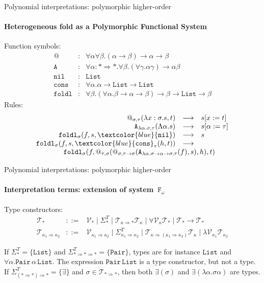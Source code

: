 \documentclass[10pt,presentation,color=names]{beamer}
\newcommand{\Fomega}{\mathtt{F}_\omega}
\newcommand{\arrkind}{\Rightarrow}
\newcommand{\arrtype}{\rightarrow}
\newcommand{\abs}[2]{\lambda #1.#2}
\newcommand{\tabs}[2]{\Lambda #1.#2}
\newcommand{\red}{\longrightarrow}
\newcommand{\Tc}{\mathcal{T}}
\newcommand{\Vc}{\mathcal{V}}
\newcommand{\symb}[1]{\textcolor{blue}{\mathtt{#1}}}
\newcommand{\List}{\mathtt{List}}
\newcommand{\Pair}{\mathtt{Pair}}
\newcommand{\nil}{\symb{nil}}
\newcommand{\cons}{\symb{cons}}
\begin{document}
\begin{frame}{Polynomial interpretations: polymorphic higher-order}
  \framesubtitle{Heterogeneous fold as a Polymorphic Functional System}
  Function symbols:
  \[
  \begin{array}{rcl}
    @ & : & \forall \alpha \forall \beta . (\alpha \arrtype \beta) \arrtype \alpha \arrtype \beta \\
    \mathtt{A} & : & \forall \alpha : * \arrkind * . \forall \beta .
    (\forall \gamma .\alpha \gamma) \arrtype \alpha \beta \\
    \mathtt{nil} & : & \List \\
    \mathtt{cons} & : & \forall \alpha . \alpha \arrtype \List \arrtype \List \\
    \mathtt{foldl} & : & \forall \beta . (\forall \alpha . \beta \arrtype \alpha \arrtype \beta) \arrtype \beta \arrtype \List \arrtype \beta
  \end{array}
  \]\pause
  Rules:
  \[
  \begin{array}{rcl}
    @_{\sigma,\tau}(\abs{x:\sigma}{s},t) & \red & s[x:=t] \\
    \mathtt{A}_{\abs{\alpha}{\sigma},\tau}(\tabs{\alpha}{s}) & \red & s[\alpha:=\tau] \\
    \mathtt{foldl}_\sigma(f,s,\nil) & \red & s \\
    \mathtt{foldl}_\sigma(f,s,\cons_\tau(h,t)) & \red & \\
    \multicolumn{3}{c}{\quad\quad\mathtt{foldl}_\sigma(f,@_{\tau,\sigma}(@_{\sigma,\tau\arrtype\sigma}(\mathtt{A}_{\abs{\alpha}{\sigma\arrtype\alpha\arrtype\sigma},\tau}(f),s),h),t)}
  \end{array}
  \]
\end{frame}

\begin{frame}{Polynomial interpretations: polymorphic higher-order}
  \framesubtitle{Interpretation terms: extension of system~$\Fomega$}
  Type constructors:
  \[
  \begin{array}{rcl}
    \Tc_{*} &::=& \Vc_{*} \mid \Sigma^T_{*} \mid \Tc_{\kappa\arrkind
      *}\Tc_{\kappa} \mid \forall\Vc_\kappa\Tc_* \mid
    \Tc_*\arrtype\Tc_* \\ \Tc_{\kappa_1\arrkind\kappa_2} &::=&
    \Vc_{\kappa_1\arrkind\kappa_2} \mid
    \Sigma^T_{\kappa_1\arrkind\kappa_2} \mid
    \Tc_{\kappa\arrkind(\kappa_1\arrkind\kappa_2)}\Tc_{\kappa} \mid
    \lambda \Vc_{\kappa_1} \Tc_{\kappa_2}
  \end{array}
  \]
  \pause
  \begin{example}
  If $\Sigma^T_{*} = \{ \List \}$ and $\Sigma^T_{* \arrkind * \arrkind
    *} = \{ \Pair \}$, types are for instance $\List$ and $\forall
  \alpha.\Pair\,\alpha\,\List$.  The expression $\Pair\,\List$ is a
  type constructor, but not a type.  If $\Sigma^T_{(* \arrkind *)
    \arrkind *} = \{ \exists \}$ and $\sigma \in \Tc_{* \arrkind *}$,
  then both $\exists(\sigma)$ and $\exists (\lambda
  \alpha.\sigma\alpha)$ are types.
  \end{example}
\end{frame}
\end{document}
